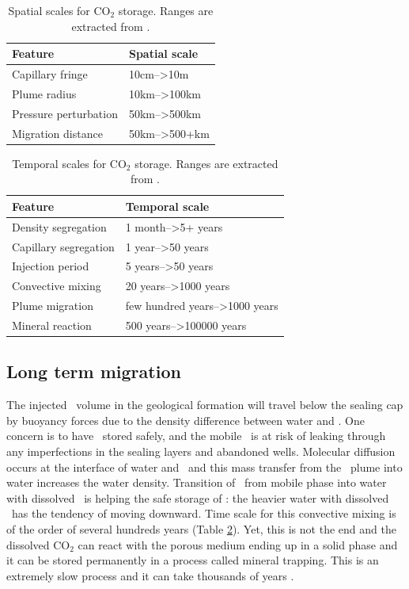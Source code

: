 \begin{table}[tbf]
  \center
  \caption{Spatial scales for $\mbox{CO}_2$ storage. Ranges are extracted from
  \cite{celia2011geological}.}
  \begin{tabular}{ |l|l| }
    \hline
    Feature& Spatial scale \\
    \hline
    Capillary fringe & 10cm-->10m\\
    \hline
    Plume radius & 10km-->100km\\
    \hline
    Pressure perturbation & 50km-->500km\\
    \hline
    Migration distance & 50km-->500+km\\
    \hline
  \end{tabular}
  \label{tab:xscl}
\end{table}

\begin{table}
\center
  \caption{Temporal scales for $\mbox{CO}_2$ storage. Ranges are extracted from
\cite{celia2011geological,gunter1997aquifer}.}
\begin{tabular}{ |l|l| }
    \hline
    Feature& Temporal scale \\
    \hline
    Density segregation & 1 month-->5+ years\\
    \hline
    Capillary segregation & 1 year-->50 years\\
    \hline
    Injection period & 5 years-->50 years\\
    \hline
    Convective mixing & 20 years-->1000 years\\
    \hline
    Plume migration & few hundred years-->1000 years\\
    \hline
    Mineral reaction & 500 years-->100000 years \\
    \hline
  \end{tabular}
  \label{tab:tscl}
\end{table}

\subsection{Long term migration}

The injected \coo\ volume in the geological formation will travel below
the sealing cap by buoyancy forces due to the density difference between water
and \coo. One concern is to have \coo\ stored safely, and the mobile
\coo\ is at risk of leaking through any imperfections in the sealing
layers and abandoned wells. Molecular diffusion occurs at the interface of water
and \coo\ and this mass transfer from the \coo\ plume into water
increases the water density. Transition of \coo\ from mobile phase
into water with dissolved \coo\ is helping the safe storage of
\coo: the heavier water with dissolved \coo\ has the tendency
of moving downward. Time scale for this convective mixing is of the order of
several hundreds years (Table \ref{tab:tscl}). Yet, this is not the end and   the
dissolved $\mbox{CO}_2$ can react with the porous medium ending up in a solid
phase and it can be stored permanently in a process called mineral trapping.
This is an 
extremely slow process and it can take thousands of years
\cite{gunter1997aquifer}.

